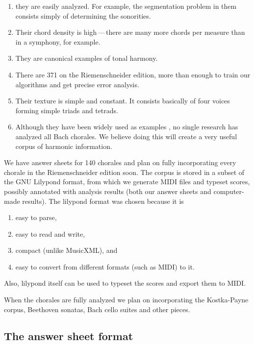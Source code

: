 \documentclass{article}
\begin{document}
\begin{enumerate}
\item they are easily analyzed. For example, the segmentation problem in
them consists simply of determining the sonorities.
\item Their chord density is high\,---\,there are many more chords per
  measure than in a symphony, for example.
\item They are canonical examples of tonal harmony.
\item There are 371 on the Riemenschneider edition, more than
  enough to train our algorithms and get precise error analysis.
\item Their texture is simple and constant. It consists basically of
  four voices forming simple triads and tetrads.
\item Although they have been widely used as examples
  \cite{taube:automatic, tsui:harmonic, illescas.ea:harmonic,
    winograd:linguistics}, no single research has analyzed all Bach
  chorales. We believe doing this will create a very useful corpus of
  harmonic information.
\end{enumerate}

We have answer sheets for 140 chorales and plan on fully incorporating
every chorale in the Riemenschneider \cite{bach:371} edition soon. The
corpus is stored in a subset of the GNU Lilypond format, from which we
generate MIDI files and typeset scores, possibly annotated with
analysis results (both our answer sheets and computer-made results).
The lilypond format was chosen because it is

\begin{enumerate}
\item easy to parse,
\item easy to read and write,
\item compact (unlike MusicXML), and
\item easy to convert from different formats (such as MIDI) to it.
\end{enumerate}

Also, lilypond itself can be used to typeset the scores and export
them to MIDI.

When the chorales are fully analyzed we plan on incorporating the
Kostka-Payne \cite{kostka.ea:tonal} corpus, Beethoven sonatas, Bach
cello suites and other pieces.

\subsection{The answer sheet format}
\label{sec:formato-dos-acordes}
\end{document}
